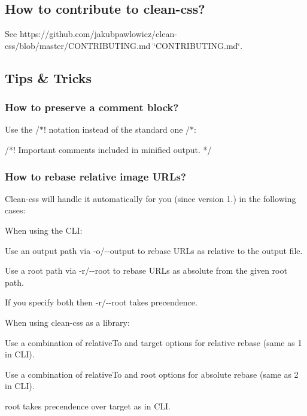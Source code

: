 \subsection*{How to contribute to clean-\/css?}

See https\+://github.com/jakubpawlowicz/clean-\/css/blob/master/\+C\+O\+N\+T\+R\+I\+B\+U\+T\+I\+N\+G.\+md \char`\"{}\+C\+O\+N\+T\+R\+I\+B\+U\+T\+I\+N\+G.\+md\char`\"{}.

\subsection*{Tips \& Tricks}

\subsubsection*{How to preserve a comment block?}

Use the {\ttfamily /$\ast$!} notation instead of the standard one {\ttfamily /$\ast$}\+:


\begin{DoxyCode}
/*!
  Important comments included in minified output.
*/
\end{DoxyCode}


\subsubsection*{How to rebase relative image U\+R\+Ls?}

Clean-\/css will handle it automatically for you (since version 1.) in the following cases\+:


\begin{DoxyItemize}
\item When using the C\+LI\+:
\begin{DoxyEnumerate}
\item Use an output path via {\ttfamily -\/o}/{\ttfamily -\/-\/output} to rebase U\+R\+Ls as relative to the output file.
\item Use a root path via {\ttfamily -\/r}/{\ttfamily -\/-\/root} to rebase U\+R\+Ls as absolute from the given root path.
\item If you specify both then {\ttfamily -\/r}/{\ttfamily -\/-\/root} takes precendence.
\end{DoxyEnumerate}
\item When using clean-\/css as a library\+:
\begin{DoxyEnumerate}
\item Use a combination of {\ttfamily relative\+To} and {\ttfamily target} options for relative rebase (same as 1 in C\+LI).
\item Use a combination of {\ttfamily relative\+To} and {\ttfamily root} options for absolute rebase (same as 2 in C\+LI).
\item {\ttfamily root} takes precendence over {\ttfamily target} as in C\+LI.
\end{DoxyEnumerate}
\end{DoxyItemize}

